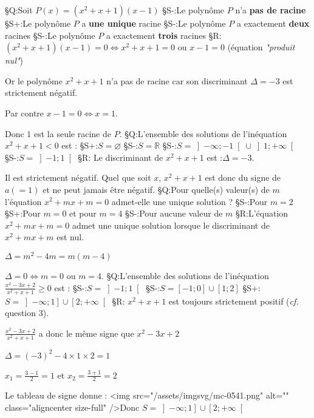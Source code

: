 §Q:Soit $P\left(x\right)=\left(x^{2}+x+1\right)\left(x-1\right)$
§S-:Le polynôme $P$ n'a \textbf{pas de racine}
§S+:Le polynôme $P$ a \textbf{une unique} racine
§S-:Le polynôme $P$ a exactement \textbf{deux} racines
§S-:Le polynôme $P$ a exactement \textbf{trois} racines
§R: $\left(x^{2}+x+1\right)\left(x-1\right)=0  \Leftrightarrow   x^{2}+x+1 = 0 $ ou $x-1=0$ (équation \textit{"produit nul"})
\par
Or le polynôme $x^{2}+x+1$ n'a pas de racine car son discriminant $\Delta  = -3$ est strictement négatif.
\par
Par contre $x-1=0 \Leftrightarrow  x=1$.
\par
Donc $1$ est la seule racine de $P$.
§Q:L'ensemble des solutions de l'inéquation $x^{2}+x+1 < 0$ est :
§S+:$S=\varnothing$
§S-:$S=\mathbb{R}$
§S-:$S=\left]-\infty  ; -1\right[ \cup  \left]1 ; +\infty \right[$
§S-:$S=\left]-1 ; 1\right[$
§R:  Le discriminant de $x^{2}+x+1$ est :$\Delta  = -3$.
\par
Il est strictement négatif. Quel que soit $x$, $x^{2}+x+1$ est donc du signe de $a \left(=1\right)$ et ne peut jamais être négatif.
§Q:Pour quelle(s) valeur(s) de $m$ l'équation $x^{2}+mx+m=0$ admet-elle une unique solution ?
§S-:Pour $m=2$
§S+:Pour $m=0$ et pour $m=4$
§S-:Pour aucune valeur de $m$
§R:L'équation $x^{2}+mx+m=0$ admet une unique solution  lorsque le discriminant de $x^{2}+mx+m$ est nul.
\par
$\Delta  = m^{2} - 4m = m\left(m-4\right)$
\par
$\Delta  = 0  \Leftrightarrow  m=0 $ ou $ m=4$.
§Q:L'ensemble des solutions de l'inéquation $\frac{x^{2}-3x+2}{x^{2}+x+1} \geqslant  0$ est :
§S-:$S=\left]-1 ; 1\right[$
§S-:$S=\left[-1 ; 0\right] \cup  \left[1 ; 2\right]$
§S+:$S=\left]-\infty  ; 1\right] \cup  \left[2 ; +\infty \right[$
§R: $x^{2}+x+1$ est toujours strictement positif (\textit{cf.} question 3).
\par
$\frac{x^{2}-3x+2}{x^{2}+x+1}$ a donc le même signe que $x^{2}-3x+2$
\par
$\Delta  = \left(-3\right)^{2}-4\times 1\times 2=1$
\par
$x_{1}=\frac{3-1}{2}=1$ et $x_{2}=\frac{3+1}{2}=2$
\par
Le tableau de signe donne :
<img src="/assets/imgsvg/mc-0541.png" alt="" class="aligncenter size-full" />Donc $S=\left]-\infty  ; 1\right] \cup  \left[2 ; +\infty \right[$
